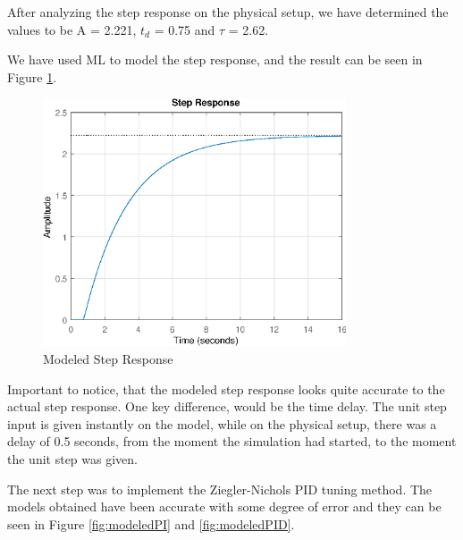 After analyzing the step response on the physical setup, we have determined the values to be A = 2.221, 
$t_d$ = 0.75 and $\tau$ = 2.62.

We have used ML to model the step response, and the result can be seen in Figure \ref{fig:modeledStepResponse}.

\begin{figure}[ht]
	\centering
	\includegraphics[width=0.8\textwidth]{figures/06ModelValidation/modeledStepResponse.eps}
	\caption{Modeled Step Response}
	\label{fig:modeledStepResponse}
\end{figure}

Important to notice, that the modeled step response looks quite accurate to the actual step response.
One key difference, would be the time delay. The unit step input is given instantly on the model,
while on the physical setup, there was a delay of 0.5 seconds, from the moment the simulation had started,
to the moment the unit step was given.

The next step was to implement the Ziegler-Nichols PID tuning method. The models obtained have been accurate
with some degree of error and they can be seen in Figure \ref{fig:modeledPI} and \ref{fig:modeledPID}.

